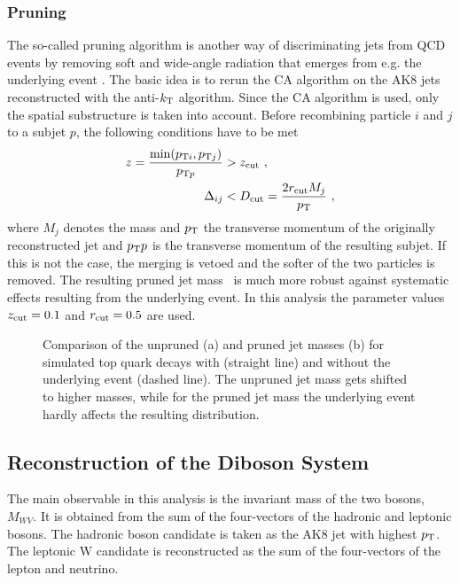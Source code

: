 \subsubsection*{Pruning}
The so-called pruning algorithm is another way of discriminating jets from QCD events by removing soft and wide-angle radiation that emerges from e.g. the underlying event  \cite{pruning}. The basic idea is to rerun the CA algorithm on the AK8 jets reconstructed with the anti-$k_{\rm T}$ algorithm. Since the CA algorithm is used, only the spatial substructure is taken into account.  Before recombining particle $i$ and $j$ to a subjet $p$, the following conditions have to be met
\begin{align}
z = \frac{\min (p_{{\rm T}i},p_{{\rm T}j})}{p_{{\rm T}p}} &> z_{\rm cut} ~, \\
\Delta_{ij} &< D_{\rm cut} = \frac{2r_{\rm cut}M_j}{p_{\rm T}} ~,
\end{align}
where $M_j$ denotes the mass and $p_{\rm T}$ the transverse momentum of the originally reconstructed jet and $p_{{\rm T}}p$ is the transverse momentum of the resulting subjet. If this is not the case, the merging is vetoed and the softer of the two particles is removed. The resulting pruned jet mass \Mpr \ is much more robust against systematic effects resulting from the underlying event. In this analysis the parameter values $z_{\rm cut}=0.1$ and $r_{\rm cut}=0.5$ are used.
\begin{figure}
	\centering
	\caption[Comparison of the pruned and unpruned jet masses for simulated top quark decays with and without the underlying event]{Comparison of the unpruned (a) and pruned jet masses (b) for simulated top quark decays with (straight line) and without the underlying event (dashed line). The unpruned jet mass gets shifted to higher masses, while for the pruned jet mass the underlying event hardly affects the resulting distribution.}
	\label{fig:reco:pruning}
\end{figure}
\subsection{Reconstruction of the Diboson System}
The main observable in this analysis is the invariant mass of the two bosons, $M_{WV}$. It is obtained from the sum of the four-vectors of the hadronic and leptonic bosons. The hadronic boson candidate is taken as the AK8 jet with highest $p_{\rm T}$. The leptonic W candidate is reconstructed as the sum of the four-vectors of the lepton and neutrino. 


